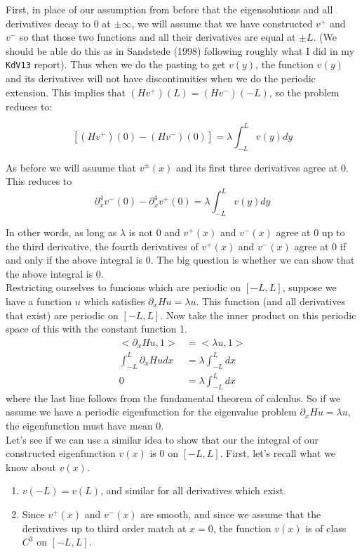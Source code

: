 \documentclass[12pt]{article}
\begin{document}
First, in place of our assumption from before that the eigensolutions and all derivatives decay to 0 at $\pm \infty$, we will assume that we have constructed $v^+$ and $v^-$ so that those two functions and all their derivatives are equal at $\pm L$. (We should be able do this as in Sandstede (1998) following roughly what I did in my \texttt{KdV13} report). Thus when we do the pasting to get $v(y)$, the function $v(y)$ and its derivatives will not have discontinuities when we do the periodic extension. This implies that $(Hv^+)(L) = (Hv^-)(-L)$, so the problem reduces to:

\[
[(Hv^+)(0) - (Hv^-)(0)] = \lambda \int_{-L}^L v(y) dy
\]

As before we will asuume that $v^\pm(x)$ and its first three derivatives agree at 0. This reduces to 
\[
\partial_x^4 v^-(0) - \partial_x^4 v^+(0) = \lambda \int_{-L}^L v(y) dy
\]

In other words, as long as $\lambda$ is not 0 and $v^+(x)$ and $v^-(x)$ agree at 0 up to the third derivative, the fourth derivatives of $v^+(x)$ and $v^-(x)$ agree at 0 if and only if the above integral is 0. The big question is whether we can show that the above integral is 0.\\

Restricting ourselves to funcions which are periodic on $[-L, L]$, suppose we have a function $u$ which satisfies $\partial_x H u = \lambda u$. This function (and all derivatives that exist) are periodic on $[-L, L]$. Now take the inner product on this periodic space of this with the constant function 1.
\begin{align*}
<\partial_x H u, 1> &= <\lambda u, 1> \\
\int_{-L}^L \partial_x H u dx &= \lambda \int_{-L}^L dx \\
0 &= \lambda \int_{-L}^L dx
\end{align*}
where the last line follows from the fundamental theorem of calculus. So if we assume we have a periodic eigenfunction for the eigenvalue problem $\partial_x H u = \lambda u$, the eigenfunction must have mean 0.\\

Let's see if we can use a similar idea to show that our the integral of our constructed eigenfunction $v(x)$ is 0 on $[-L, L]$. First, let's recall what we know about $v(x)$.

\begin{enumerate}
	\item $v(-L) = v(L)$, and similar for all derivatives which exist.
	\item Since $v^+(x)$ and $v^-(x)$ are smooth, and since we assume that the derivatives up to third order match at $x = 0$, the function $v(x)$ is of class $C^3$ on $[-L, L]$.
\end{enumerate}
\end{document}
